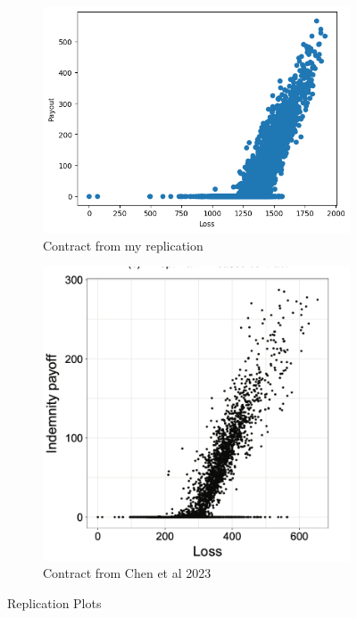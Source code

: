 \documentclass[11pt]{article}
\begin{document}
  \begin{figure}[H]
    \centering
      \begin{subfigure}[b]{0.47\textwidth}
        \includegraphics[width=\textwidth]{..//../../output/figures/Chen_Replication/NN_payout.png}
    \caption{Contract from my replication}
        \label{fig:f1}
      \end{subfigure}
     \hfill
      \begin{subfigure}[b]{0.47\textwidth}
        \includegraphics[width=\textwidth]{..//../../output/figures/Chen_Replication/Chen_payout.png}
    \caption{Contract from Chen et al 2023}
        \label{fig:f2}
      \end{subfigure}
      \caption{Replication Plots}
    \end{figure}
\end{document}
